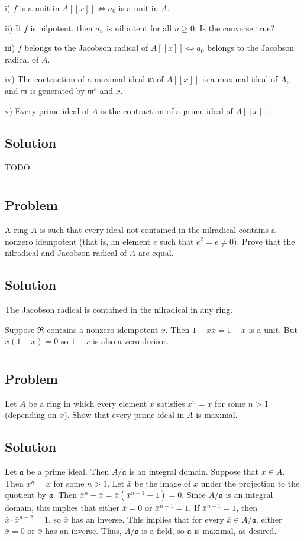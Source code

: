 \documentclass[book,12pt,oneside,openany]{memoir}
\begin{document}
i) $f$ is a unit in $A[[x]] \Leftrightarrow a_0$ is a unit in $A$.

ii) If $f$ is nilpotent, then $a_n$ is nilpotent for all $n \geq 0$. Is the converse true?

iii) $f$ belongs to the Jacobson radical of $A[[x]] \Leftrightarrow a_0$ belongs to the Jacobson radical of $A$.

iv) The contraction of a maximal ideal $\mathfrak{m}$ of $A[[x]]$ is a maximal ideal of $A$, and $\mathfrak{m}$ is generated by $\mathfrak{m}^c$ and $x$.

v) Every prime ideal of $A$ is the contraction of a prime ideal of $A[[x]]$.


\subsection{Solution}
TODO
\section{}
\subsection{Problem}
A ring $A$ is such that every ideal not contained in the nilradical contains a nonzero idempotent (that is, an element $e$ such that $e^2 = e \neq 0$). Prove that the nilradical and Jacobson radical of $A$ are equal.
\subsection{Solution}
The Jacobson radical is contained in the nilradical in any ring.

Suppose $\mathfrak R$ contains a nonzero idempotent $x$.
Then $1-xx=1-x$ is a unit.
But $x(1-x)=0$ so $1-x$ is also a zero divisor.


\section{}
\subsection{Problem}
Let $A$ be a ring in which every element $x$ satisfies $x^n = x$ for some $n > 1$ (depending on $x$). Show that every prime ideal in $A$ is maximal.
\subsection{Solution}
Let $\mathfrak{a}$ be a prime ideal. Then $A/\mathfrak{a}$ is an integral domain. Suppose that $x \in A$. Then $x^n = x$ for some $n > 1$. Let $\bar{x}$ be the image of $x$ under the projection to the quotient by $\mathfrak{a}$. Then $\bar{x}^n - \bar{x} = \bar{x} (\bar{x}^{n-1} - 1) = 0$. Since $A/\mathfrak{a}$ is an integral domain, this implies that either $\bar{x} = 0$ or $\bar{x}^{n-1} = 1$. If $\bar{x}^{n-1} = 1$, then $\bar{x} \cdot \bar{x}^{n-2} = 1$, so $\bar{x}$ has an inverse. This implies that for every $\bar{x} \in A/\mathfrak{a}$, either $\bar{x} = 0$ or $\bar{x}$ has an inverse. Thus, $A/\mathfrak{a}$ is a field, so $\mathfrak{a}$ is maximal, as desired.
\end{document}
